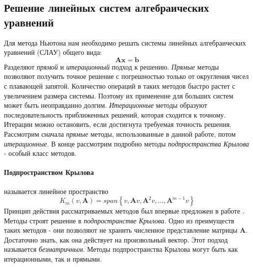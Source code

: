 \subsection{Решение линейных систем алгебраических уравнений \label{methods:linear_solvers}}
Для метода Ньютона нам необходимо решать системы линейных алгебраических уравнений (СЛАУ)
общего вида:
\begin{equation} \label{eq:linear_system}
\mathbf{Ax} = \mathbf{b}
\end{equation}
Разделяют \textit{прямой} и  \textit{итерационный} подход к решению. \textit{Прямые} методы позволяют получить точное решение с погрешностью только от округления чисел с плавающей запятой. Количество операций в таких методов быстро растет с увеличением размера системы. Поэтому их применение для больших систем может быть неоправданно долгим. \textit{Итерационные} методы образуют последовательность приближенных решений, которая сходится к точному. Итерации можно остановить, если достигнута требуемая точность решения. Рассмотрим сначала \textit{прямые} методы, использованные в данной работе, потом \textit{итерационные}. В конце рассмотрим подробно методы \textit{подпространства Крылова} - особый класс методов.
\paragraph{Подпространством Крылова} называется линейное пространство
\begin{equation} \label{eq:krylov_subspace}
K_m(v, \mathbf{A}) = span\left\{ v, \mathbf{A}v, \mathbf{A}^2v, \dots, \mathbf{A}^{m-1}v \right\}
\end{equation}
Принцип действия рассматриваемых методов был впервые предложен в работе \cite{Krylov}.
Методы строят решение в \textit{подпространстве Крылова}. Одно из преимуществ таких методов - они позволяют не хранить численное представление матрицы $\mathbf{A}$. Достаточно знать, как она действует на произвольный вектор. Этот подход называется \textit{безматричным}. Методы подпространства Крылова могут быть как итерационными, так и прямыми.

